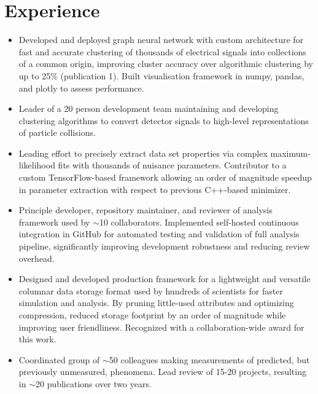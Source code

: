 \documentclass[9pt,a4paper]{moderncv}
\begin{document}
\section{Experience}
{
\begin{itemize}
    \item Developed and deployed graph neural network with custom architecture for fast and accurate clustering of thousands of electrical signals into collections of a common origin,
        improving cluster accuracy over algorithmic clustering by up to 25\% (publication 1). Built visualisation framework in numpy, pandas, and plotly to assess performance.
    \item Leader of a 20 person development team maintaining and developing clustering algorithms to convert detector signals to high-level representations of particle collisions.
    \item Leading effort to precisely extract data set properties via complex maximum-likelihood fits with thousands of nuisance parameters. Contributor to a custom TensorFlow-based framework allowing an order of magnitude speedup in parameter extraction with respect to previous C++-based minimizer.
    \item Principle developer, repository maintainer, and reviewer of analysis framework used by $\sim$10 collaborators. Implemented self-hosted continuous integration in GitHub for automated testing and validation of full analysis pipeline, significantly improving development robustness and reducing review overhead.
    \item Designed and developed production framework for a lightweight and versatile columnar data storage format used by hundreds of scientists for faster simulation and analysis. By pruning little-used attributes and optimizing compression, reduced storage footprint by an order of magnitude while improving user friendliness. Recognized with a collaboration-wide award for this work.
    \item Coordinated group of $\sim$50 colleagues making measurements of predicted, but previously unmeasured, phenomena. Lead review of 15-20 projects, resulting in $\sim$20 publications over two years.
\end{itemize}
}
\end{document}
